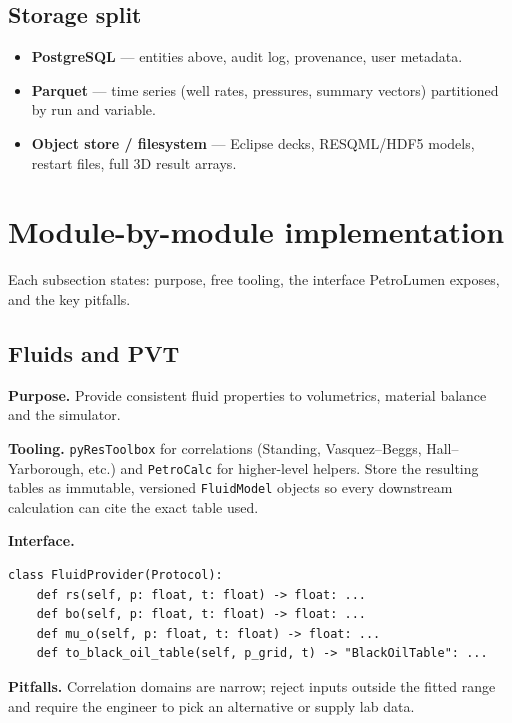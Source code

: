 \documentclass[11pt,a4paper]{article}
\begin{document}
\subsection{Storage split}
\begin{itemize}[leftmargin=1.4em]
  \item \textbf{PostgreSQL} --- entities above, audit log, provenance, user
        metadata.
  \item \textbf{Parquet} --- time series (well rates, pressures, summary
        vectors) partitioned by run and variable.
  \item \textbf{Object store / filesystem} --- Eclipse decks, RESQML/HDF5
        models, restart files, full 3D result arrays.
\end{itemize}

\section{Module-by-module implementation}

Each subsection states: purpose, free tooling, the interface PetroLumen exposes,
and the key pitfalls.

\subsection{Fluids and PVT}
\textbf{Purpose.} Provide consistent fluid properties to volumetrics,
material balance and the simulator.

\textbf{Tooling.} \texttt{pyResToolbox} for correlations (Standing, Vasquez--Beggs,
Hall--Yarborough, etc.) and \texttt{PetroCalc} for higher-level helpers. Store
the resulting tables as immutable, versioned \texttt{FluidModel} objects so
every downstream calculation can cite the exact table used.

\textbf{Interface.}
\begin{lstlisting}[caption={Fluids package contract.}]
class FluidProvider(Protocol):
    def rs(self, p: float, t: float) -> float: ...
    def bo(self, p: float, t: float) -> float: ...
    def mu_o(self, p: float, t: float) -> float: ...
    def to_black_oil_table(self, p_grid, t) -> "BlackOilTable": ...
\end{lstlisting}

\textbf{Pitfalls.} Correlation domains are narrow; reject inputs outside the
fitted range and require the engineer to pick an alternative or supply lab data.
\end{document}
